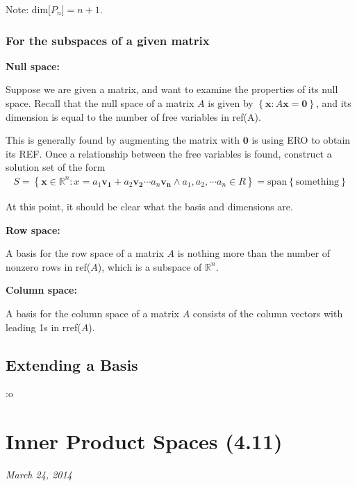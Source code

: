 \documentclass[a4paper,10pt]{report}
\begin{document}
Note: dim[$P_n$]$=n+1$.

\textbf{}

\subsubsection{For the subspaces of a given matrix}
\textbf{Null space:}

Suppose we are given a matrix, and want to examine the properties of its null space. Recall that the null space of a matrix $A$ is given by $\left\{ \mathbf{x}: A\mathbf{x} = \mathbf{0}\right\}$, and its dimension is equal to the number of free variables in ref(A).

This is generally found by augmenting the matrix with $\mathbf{0}$ is using ERO to obtain its REF. Once a relationship between the free variables is found, construct a solution set of the form
\begin{align*}
S = \left\{ \mathbf{x}\in \mathbb{R}^n : x = a_1\mathbf{v_1} + a_2\mathbf{v_2} \cdots a_n\mathbf{v_n} \land a_1,a_2,\cdots a_n \in R \right\} = \text{span}\left\{ \text{something}\right\}
\end{align*}

At this point, it should be clear what the basis and dimensions are.

\textbf{Row space:}

A basis for the row space of a matrix $A$ is nothing more than the number of nonzero rows in ref($A$), which is a subspace of $\mathbb{R}^n$.

\textbf{Column space:}

A basis for the column space of a matrix $A$ consists of the column vectors with leading 1s in rref($A$).



\subsection{Extending a Basis}
:o

\section{Inner Product Spaces (4.11)}
\textit{March 24, 2014}\\
\end{document}
